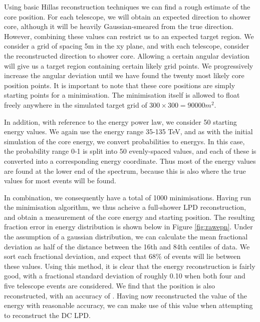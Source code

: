 \documentclass[11pt]{article}
\begin{document}
Using basic Hillas reconstruction techniques we can find a rough estimate of the core position. For each telescope, we will obtain an expected direction to shower core, although it will be heavily Gaussian-smeared from the true direction. However, combining these values can restrict us to an expected target region. We consider a grid of spacing 5m in the xy plane, and with each telescope, consider the reconstructed direction to shower core. Allowing a certain angular deviation will give us a target region containing certain likely grid points. We progressively increase the angular deviation until we have found the twenty most likely core position points. It is important to note that these core positions are simply starting points for a minimisation. The minimisation itself is allowed to float freely anywhere in the simulated target grid of $300 \times 300 = 90000 m^{2}$.

In addition, with reference to the energy power law, we consider 50 starting energy values. We again use the energy range 35-135 TeV, and as with the initial simulation of the core energy, we convert probabilities to energys. In this case, the probability range 0-1 is split into 50 evenly-spaced values, and each of these is converted into a corresponding energy coordinate. Thus most of the energy values are found at the lower end of the spectrum, because this is also where the true values for most events will be found.

In combination, we consequently have a total of 1000 minimisations. Having run the minimisation algorithm, we thus acheive a full-shower LPD reconstruction, and obtain a measurement of the core energy and starting position. The resulting fraction error in energy distribution is shown below in Figure \ref{fig:rawepn}. Under the assumption of a gaussian distribution, we can calculate the mean fractional deviation as half of the distance between the 16th and 84th centiles of data. We sort each fractional deviation, and expect that 68\% of events will lie between these values. Using this method, it is clear that the energy reconstruction is fairly good, with a fractional standard deviation of roughly 0.10 when both four and five telescope events are considered. We find that the position is also reconstructed, with an accuracy of . Having now reconstructed the value of the energy with reasonable accuracy, we can make use of this value when attempting to reconstruct the DC LPD. 
\end{document}
